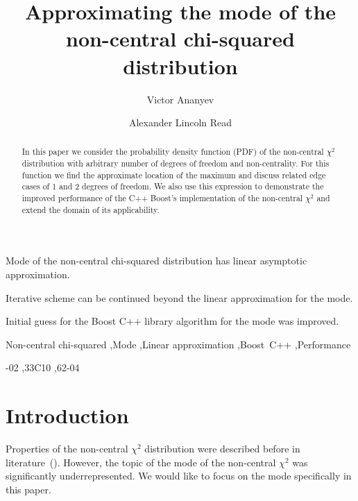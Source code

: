 \documentclass[final,5p,twocolumn,times,authoryear]{elsarticle}
\begin{document}
\begin{frontmatter}

\title{Approximating the mode of the non-central chi-squared distribution}

\author[uio]{Victor Ananyev}
\author[uio]{Alexander Lincoln Read}

\begin{abstract}
In this paper we consider the probability density function (PDF) of the non-central $\chi^2$ distribution with arbitrary number of degrees of freedom and non-centrality. For this function we find the approximate location of the maximum and discuss related edge cases of 1 and 2 degrees of freedom. We also use this expression to demonstrate the improved performance of the C++ Boost's implementation of the non-central $\chi^2$ and extend the domain of its applicability.
\end{abstract}

\begin{highlights}
\item Mode of the non-central chi-squared distribution has linear asymptotic approximation.
\item Iterative scheme can be continued beyond the linear approximation for the mode.
\item Initial guess for the Boost C++ library algorithm for the mode was improved.
\end{highlights}

\begin{keyword}
Non-central chi-squared \sep Mode \sep Linear approximation \sep Boost~C++ \sep Performance

-02 \sep 33C10 \sep 62-04
\end{keyword}

\end{frontmatter}


\section{Introduction}\label{introduction}
Properties of the non-central $\chi^2$ distribution were described before in literature~(\cite{Andrs2008, hogan2013, Saulis2001}). However, the topic of the mode of the non-central $\chi^2$ was significantly underrepresented. We would like to focus on the mode specifically in this paper.
\end{document}
